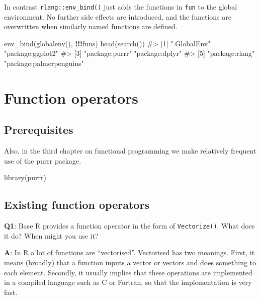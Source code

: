 \documentclass[
]{krantz}
\makeatletter
\newenvironment{Shaded}{\begin{snugshade}}{\end{snugshade}}
\newcommand{\CommentTok}[1]{\textcolor[rgb]{0.56,0.35,0.01}{\textit{#1}}}
\newcommand{\KeywordTok}[1]{\textcolor[rgb]{0.13,0.29,0.53}{\textbf{#1}}}
\newcommand{\NormalTok}[1]{#1}
\newcommand{\OperatorTok}[1]{\textcolor[rgb]{0.81,0.36,0.00}{\textbf{#1}}}
\newenvironment{kframe}{%
\medskip{}
\setlength{\fboxsep}{.8em}
 \def\at@end@of@kframe{}%
 \ifinner\ifhmode%
  \def\at@end@of@kframe{\end{minipage}}%
  \begin{minipage}{\columnwidth}%
 \fi\fi%
 \def\FrameCommand##1{\hskip\@totalleftmargin \hskip-\fboxsep
 \colorbox{shadecolor}{##1}\hskip-\fboxsep
     \hskip-\linewidth \hskip-\@totalleftmargin \hskip\columnwidth}%
 \MakeFramed {\advance\hsize-\width
   \@totalleftmargin\z@ \linewidth\hsize
   \@setminipage}}%
 {\par\unskip\endMakeFramed%
 \at@end@of@kframe}
\renewenvironment{Shaded}{\begin{kframe}}{\end{kframe}}
\renewcommand{\KeywordTok} [1]{\textcolor[rgb]{0.00,0.44,0.13}{{#1}}}
\renewcommand{\CommentTok} [1]{\textcolor[rgb]{0.38,0.63,0.69}{{#1}}}
\renewcommand{\NormalTok}  [1]{{#1}}
\makeatother
\begin{document}
In contrast \texttt{rlang::env\_bind()} just adds the functions in \texttt{fun} to the global environment. No further side effects are introduced, and the functions are overwritten when similarly named functions are defined.

\begin{Shaded}
\begin{Highlighting}[]
\KeywordTok{env_bind}\NormalTok{(}\KeywordTok{globalenv}\NormalTok{(), }\OperatorTok{!!!}\NormalTok{funs)}
\KeywordTok{head}\NormalTok{(}\KeywordTok{search}\NormalTok{())}
\CommentTok{#> [1] ".GlobalEnv"             "package:ggplot2"       }
\CommentTok{#> [3] "package:purrr"          "package:dplyr"         }
\CommentTok{#> [5] "package:rlang"          "package:palmerpenguins"}
\end{Highlighting}
\end{Shaded}

\hypertarget{function-operators}{%
\chapter{Function operators}\label{function-operators}}

\hypertarget{prerequisites-5}{%
\section*{Prerequisites}\label{prerequisites-5}}


Also, in the third chapter on functional programming we make relatively frequent use of the purrr package.

\begin{Shaded}
\begin{Highlighting}[]
\KeywordTok{library}\NormalTok{(purrr)}
\end{Highlighting}
\end{Shaded}


\hypertarget{existing-function-operators}{%
\section{Existing function operators}\label{existing-function-operators}}

\textbf{{Q1}}: Base R provides a function operator in the form of \texttt{Vectorize()}. What does it do? When might you use it?

\textbf{{A}}: In R a lot of functions are ``vectorised''. Vectorised has two meanings. First, it means (broadly) that a function inputs a vector or vectors and does something to each element. Secondly, it usually implies that these operations are implemented in a compiled language such as C or Fortran, so that the implementation is very fast.
\end{document}
